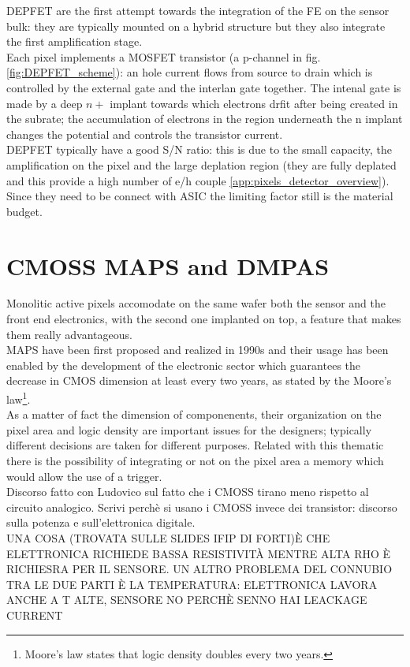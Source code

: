    DEPFET are the first attempt towards the integration of the FE on the sensor bulk: they are typically mounted on a hybrid structure but they also integrate the first amplification stage.\\
   Each pixel implements a MOSFET transistor (a p-channel in fig. \ref{fig:DEPFET_scheme}): an hole current flows from source to drain which is controlled by the external gate and the interlan gate together. The intenal gate is made by a deep $n+$ implant towards which electrons drfit after being created in the subrate; the accumulation of electrons in the region underneath the n implant changes the potential and controls the transistor current.\\
   DEPFET typically have a good S/N ratio: this is due to the small capacity, the amplification on the pixel and the large deplation region (they are fully deplated and this provide a high number of e/h couple \ref{app:pixels_detector_overview}). Since they need to be connect with ASIC the limiting factor still is the material budget.

\section{CMOSS MAPS and DMPAS}
   Monolitic active pixels accomodate on the same wafer both the sensor and the front end electronics, with the second one implanted on top, a feature that makes them really advantageous. \\
   MAPS have been first proposed and realized in 1990s and their usage has been enabled by the development of the electronic sector which guarantees the decrease in CMOS dimension at least every two years, as stated by the Moore's law\footnote{Moore's law states that logic density doubles every two years.}.\\
   As a matter of fact the dimension of componenents, their organization on the pixel area and logic density are important issues for the designers; typically different decisions are taken for different purposes. Related with this thematic there is the possibility of integrating or not on the pixel area a memory which would allow the use of a trigger. \\ 

   Discorso fatto con Ludovico
   sul fatto che i CMOSS tirano meno rispetto al circuito analogico.
   Scrivi perchè si usano i CMOSS invece dei transistor: discorso sulla potenza e sull'elettronica digitale.\\      
   UNA COSA (TROVATA SULLE SLIDES IFIP DI FORTI)È CHE ELETTRONICA RICHIEDE BASSA RESISTIVITÀ MENTRE ALTA RHO È RICHIESRA PER IL SENSORE. UN ALTRO PROBLEMA DEL CONNUBIO TRA LE DUE PARTI È LA TEMPERATURA: ELETTRONICA LAVORA ANCHE A T ALTE, SENSORE NO PERCHÈ SENNO HAI LEACKAGE CURRENT\\

